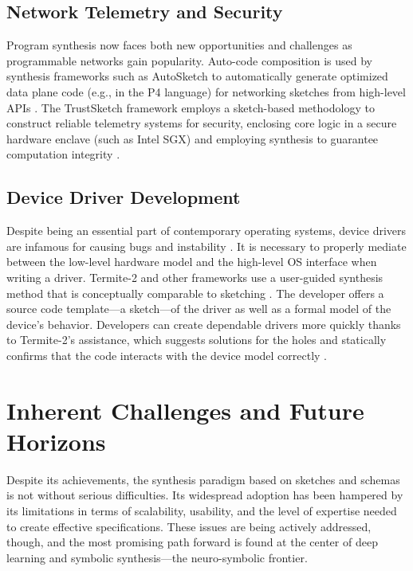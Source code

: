 \documentclass[12pt, a4paper]{report}
\begin{document}
\subsection{Network Telemetry and Security}
Program synthesis now faces both new opportunities and challenges as programmable networks gain popularity. Auto-code composition is used by synthesis frameworks such as AutoSketch to automatically generate optimized data plane code (e.g., in the P4 language) for networking sketches from high-level APIs \citep{sivaraman2018autocomposing}. The TrustSketch framework employs a sketch-based methodology to construct reliable telemetry systems for security, enclosing core logic in a secure hardware enclave (such as Intel SGX) and employing synthesis to guarantee computation integrity \citep{vasconcelos2020trustsketch}.

\subsection{Device Driver Development}
Despite being an essential part of contemporary operating systems, device drivers are infamous for causing bugs and instability \citep{chou2001empirical}. It is necessary to properly mediate between the low-level hardware model and the high-level OS interface when writing a driver. Termite-2 and other frameworks use a user-guided synthesis method that is conceptually comparable to sketching \citep{joshi2007termite2}. The developer offers a source code template—a sketch—of the driver as well as a formal model of the device's behavior. Developers can create dependable drivers more quickly thanks to Termite-2's assistance, which suggests solutions for the holes and statically confirms that the code interacts with the device model correctly \citep{joshi2007termite2}.

\section{Inherent Challenges and Future Horizons}
Despite its achievements, the synthesis paradigm based on sketches and schemas is not without serious difficulties. Its widespread adoption has been hampered by its limitations in terms of scalability, usability, and the level of expertise needed to create effective specifications. These issues are being actively addressed, though, and the most promising path forward is found at the center of deep learning and symbolic synthesis—the neuro-symbolic frontier.
\end{document}
